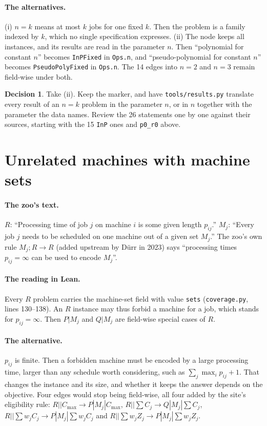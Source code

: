 \documentclass[11pt]{article}
\newcommand{\lean}[1]{\texttt{#1}}
\newcommand{\Cmax}{C_{\max}}
\theoremstyle{definition}
\newtheorem{decision}{Decision}
\begin{document}
\paragraph{The alternatives.} (i) $n=k$ means at most $k$ jobs for one
fixed $k$. Then the problem is a family indexed by $k$, which no single
specification expresses. (ii) The node keeps all instances, and its results are
read in the parameter $n$. Then ``polynomial for constant $n$'' becomes
\lean{InPFixed} in \lean{Ops.n}, and ``pseudo-polynomial for constant $n$''
becomes \lean{PseudoPolyFixed} in \lean{Ops.n}. The 14 edges into $n=2$ and
$n=3$ remain field-wise under both.

\begin{decision}
Take (ii). Keep the marker, and have \lean{tools/results.py} translate every
result of an $n=k$ problem in the parameter $n$, or in $n$ together with the
parameter the data names. Review the 26 statements one by one against their
sources, starting with the 15 \lean{InP} ones and \lean{p0\_r0} above.
\end{decision}

\section{Unrelated machines with machine sets}\label{sec:R}

\paragraph{The zoo's text.} $R$: ``Processing time of job $j$ on machine $i$
is some given length $p_{ij}$.'' $M_j$: ``Every job $j$ needs to be scheduled on
one machine out of a given set $M_j$.'' The zoo's own rule $M_j;R \to R$
(added upstream by Dürr in 2023) says ``processing times $p_{ij}=\infty$ can be
used to encode $M_j$''.

\paragraph{The reading in Lean.} Every $R$ problem carries the machine-set
field with value \lean{sets} (\lean{coverage.py}, lines 130--138). An $R$
instance may thus forbid a machine for a job, which stands for $p_{ij}=\infty$.
Then $P|M_j$ and $Q|M_j$ are field-wise special cases of $R$.

\paragraph{The alternative.} $p_{ij}$ is finite. Then a forbidden machine
must be encoded by a large processing time, larger than any schedule worth
considering, such as $\sum_j \max_i p_{ij}+1$. That changes the instance and
its size, and whether it keeps the answer depends on the objective. Four
edges would stop being field-wise, all four added by the site's
eligibility rule: $R||\Cmax\to P|M_j|\Cmax$, $R||\sum C_j \to Q|M_j|\sum C_j$,
$R||\sum w_jC_j\to P|M_j|\sum w_jC_j$ and $R||\sum w_jZ_j \to P|M_j|\sum w_jZ_j$.
\end{document}
